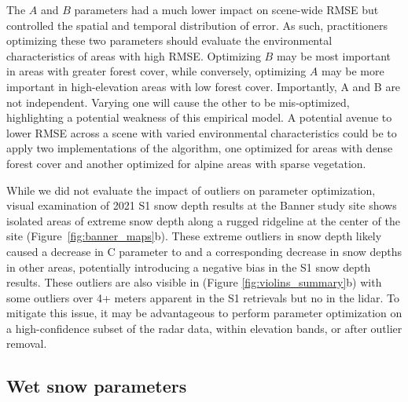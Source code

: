 \documentclass[journal abbreviation, manuscript]{copernicus}
\begin{document}
The $A$ and $B$ parameters had a much lower impact on scene-wide RMSE but controlled the spatial and temporal distribution of error. As such, practitioners optimizing these two parameters should evaluate the environmental characteristics of areas with high RMSE. Optimizing $B$ may be most important in areas with greater forest cover, while conversely, optimizing $A$ may be more important in high-elevation areas with low forest cover. Importantly, A and B are not independent. Varying one will cause the other to be mis-optimized, highlighting a potential weakness of this empirical model. A potential avenue to lower RMSE across a scene with varied environmental characteristics could be to apply two implementations of the algorithm, one optimized for areas with dense forest cover and another optimized for alpine areas with sparse vegetation.

While we did not evaluate the impact of outliers on parameter optimization, visual examination of 2021 S1 snow depth results at the Banner study site shows isolated areas of extreme snow depth along a rugged ridgeline at the center of the site (Figure~\ref{fig:banner_maps}b). These extreme outliers in snow depth likely caused a decrease in C parameter to and a corresponding decrease in snow depths in other areas, potentially introducing a negative bias in the S1 snow depth results. These outliers are also visible in (Figure \ref{fig:violins_summary}b) with some outliers over 4+ meters apparent in the S1 retrievals but no in the lidar. To mitigate this issue, it may be advantageous to perform parameter optimization on a high-confidence subset of the radar data, within elevation bands, or after outlier removal.

\subsection{Wet snow parameters}
\end{document}
